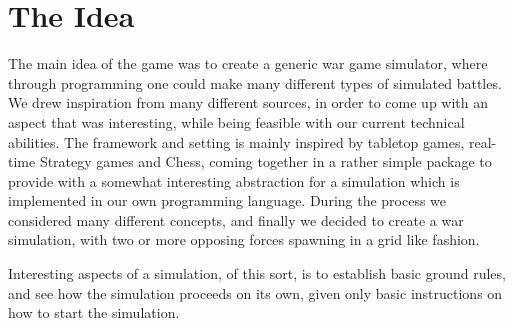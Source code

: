 \section{The Idea}
	The main idea of the game was to create a generic war game simulator, where through programming one could make many different types of 
	simulated battles. We drew inspiration from many different sources, 
	in order to come up with an aspect that was interesting, while being feasible with our current technical abilities.
	The framework and setting is mainly inspired by tabletop games, real-time Strategy games and Chess, 
	coming together in a rather simple package to provide with a somewhat 
	interesting abstraction for a simulation which is implemented in our own programming language.
	During the process we considered many different concepts, 
	and finally we decided to create a war simulation, with two or more opposing forces 
	spawning in a grid like fashion. 
	
	Interesting aspects of a simulation, of this sort, is to establish basic ground rules, 
	and see how the simulation proceeds on its own, given only basic instructions on how to start the simulation.